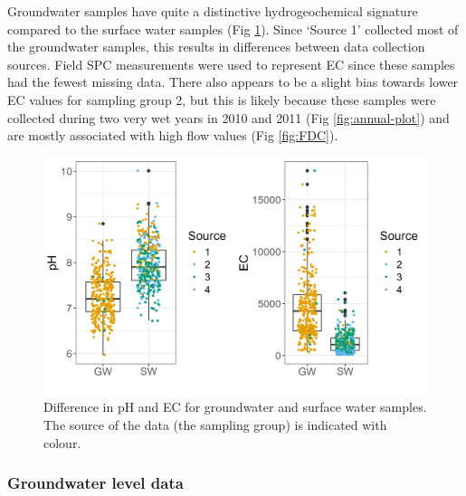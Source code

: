\documentclass[, manuscript]{copernicus}
\begin{document}
Groundwater samples have quite a distinctive hydrogeochemical signature
compared to the surface water samples (Fig \ref{fig:gw_sw-plot}). Since
`Source 1' collected most of the groundwater samples, this results in
differences between data collection sources. Field SPC measurements were
used to represent EC since these samples had the fewest missing data.
There also appears to be a slight bias towards lower EC values for
sampling group 2, but this is likely because these samples were
collected during two very wet years in 2010 and 2011 (Fig
\ref{fig:annual-plot}) and are mostly associated with high flow values
(Fig \ref{fig:FDC}).

\begin{figure}
\includegraphics[width=0.8\linewidth]{Figures/gwsw} \caption{Difference in pH and EC for groundwater and surface water samples. The source of the data (the sampling group) is indicated with colour.}\label{fig:gw_sw-plot}
\end{figure}

\subsubsection{Groundwater level data}
\end{document}
